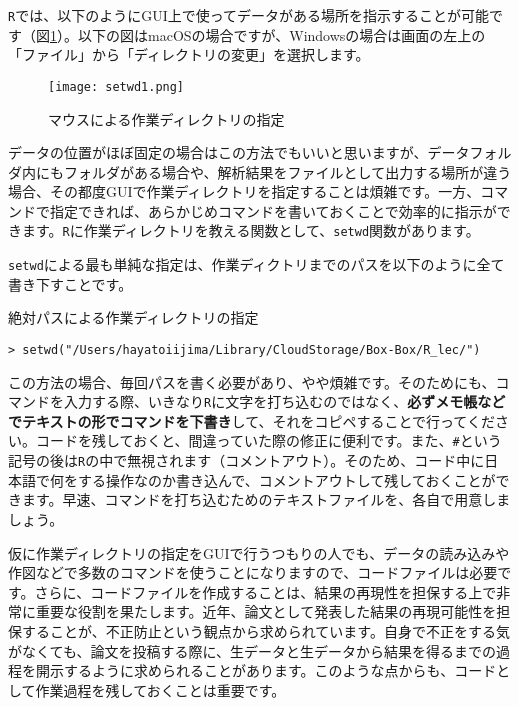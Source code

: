 \texttt{R}では、以下のようにGUI上で使ってデータがある場所を指示することが可能です（図\ref{setwd1}）。以下の図はmacOSの場合ですが、Windowsの場合は画面の左上の「ファイル」から「ディレクトリの変更」を選択します。
\begin{figure}[htb]
\begin{center}
\graphicspath{{1_basic/figs/}}
\texttt{[image: setwd1.png]}\\
\caption{マウスによる作業ディレクトリの指定}
\label{setwd1}
\end{center}
\end{figure}

\clearpage
データの位置がほぼ固定の場合はこの方法でもいいと思いますが、データフォルダ内にもフォルダがある場合や、解析結果をファイルとして出力する場所が違う場合、その都度GUIで作業ディレクトリを指定することは煩雑です。一方、コマンドで指定できれば、あらかじめコマンドを書いておくことで効率的に指示ができます。\texttt{R}に作業ディレクトリを教える関数として、\texttt{setwd}関数があります。

\texttt{setwd}による最も単純な指定は、作業ディクトリまでのパスを以下のように全て書き下すことです。

\begin{itembox}[l]{絶対パスによる作業ディレクトリの指定}
\begin{verbatim}
> setwd("/Users/hayatoiijima/Library/CloudStorage/Box-Box/R_lec/")
\end{verbatim}
\end{itembox}

この方法の場合、毎回パスを書く必要があり、やや煩雑です。そのためにも、コマンドを入力する際、いきなり\texttt{R}に文字を打ち込むのではなく、\textbf{必ずメモ帳などでテキストの形でコマンドを下書き}して、それをコピペすることで行ってください。コードを残しておくと、間違っていた際の修正に便利です。また、\verb|#|という記号の後は\texttt{R}の中で無視されます（コメントアウト）。そのため、コード中に日本語で何をする操作なのか書き込んで、コメントアウトして残しておくことができます。早速、コマンドを打ち込むためのテキストファイルを、各自で用意しましょう。

仮に作業ディレクトリの指定をGUIで行うつもりの人でも、データの読み込みや作図などで多数のコマンドを使うことになりますので、コードファイルは必要です。さらに、コードファイルを作成することは、結果の再現性を担保する上で非常に重要な役割を果たします。近年、論文として発表した結果の再現可能性を担保することが、不正防止という観点から求められています。自身で不正をする気がなくても、論文を投稿する際に、生データと生データから結果を得るまでの過程を開示するように求められることがあります。このような点からも、コードとして作業過程を残しておくことは重要です。

